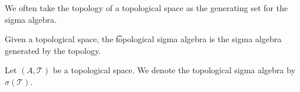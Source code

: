 

We often take the
topology of a topological
space as the generating
set for the sigma algebra.


Given a topological space, the
\t{topological sigma algebra}
is the sigma algebra generated
by the topology.


Let $(A, \mathcal{T})$ be a topological space.
We denote the
topological sigma algebra
by $\sigma(\mathcal{T})$.
